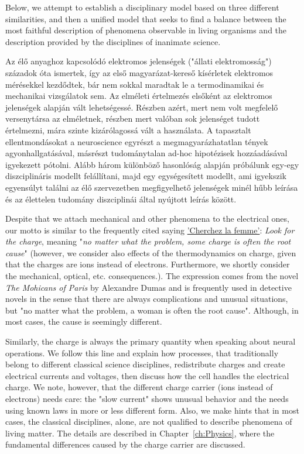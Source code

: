 Below, we attempt to establish a disciplinary model based on three different similarities, and then a unified model that seeks to find a balance between the most faithful description of phenomena observable in living organisms and the description provided by the disciplines of inanimate science.

\else

Az élő anyaghoz kapcsolódó elektromos  jelenségek ("állati elektromosság") századok óta ismertek, így az első magyarázat-kereső kísérletek elektromos mérésekkel kezdődtek, bár nem sokkal maradtak le a termodinamikai és mechanikai vizsgálatok sem. Az elméleti értelmezés elsőként az elektromos jelenségek alapján vált lehetségessé. Részben azért, mert nem volt megfelelő versenytársa az elméletnek, részben mert valóban sok jelenséget tudott értelmezni, mára szinte kizárólagossá vált a használata. A tapasztalt ellentmondásokat a neuroscience egyrészt a megmagyarázhatatlan tények agyonhallgatásával, másrészt tudománytalan ad-hoc hipotézisek hozzáadásával igyekezett pótolni.
Alább három különböző hasonlóság alapján próbálunk egy-egy diszciplináris modellt felállítani, majd egy egységesített modellt, ami igyekszik egyensúlyt találni az élő szervezetben megfigyelhető jelenségek minél hűbb leírása és az élettelen tudomány diszciplinái által nyújtott leírás között.
\fi

\ifx\magyar\undefined
Despite that we attach mechanical and other phenomena to the
electrical ones, our motto is similar to the frequently cited saying \href{https://en.wikipedia.org/wiki/Cherchez_la_femme"}{'Cherchez la femme'}:
\textit{Look for the charge},
meaning "\textit{no matter what the problem, some charge is often the root cause}" (however, we consider also effects of the thermodynamics 
on charge, given that the charges are ions instead of electrons. Furthermore, we shortly consider the mechanical, optical, etc. consequences.).
The expression comes from the novel \textit{The Mohicans of Paris} by Alexandre Dumas and is frequently used
in detective novels in the sense that there are always complications and unusual
situations, but "no matter what the problem, a woman is often the root cause". 
Although, in most cases, the cause is seemingly different.

Similarly, the charge is always the primary quantity when speaking about neural operations. 
We follow this line and explain how processes, that traditionally
belong to different classical science disciplines, redistribute charges and create
electrical currents and voltages, then discuss how the cell handles the electrical charge. We note, however, that the different charge carrier (ions instead of electrons) needs care: the "slow current"
shows unusual behavior and the needs using known laws in 
more or less different form.
Also, we make hints that in most cases, the classical disciplines, alone, are not qualified to describe phenomena of living matter.
The details are described in Chapter~\ref{ch:Physics}, where
the fundamental differences caused by the charge carrier are discussed. 

